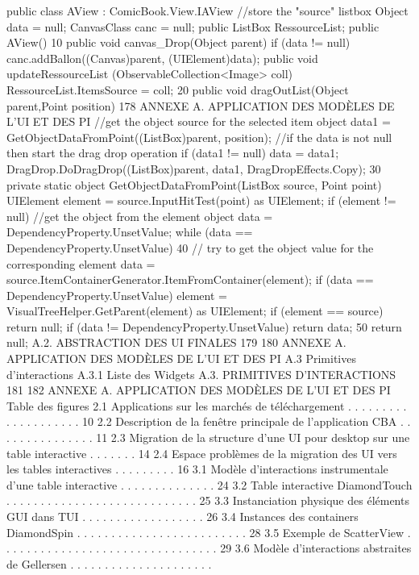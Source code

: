 \documentclass{article}
\begin{document}
{
public class AView : ComicBook.View.IAView
{
//store the "source" listbox
Object data = null;
CanvasClass canc = null;
public ListBox RessourceList;
public AView()
10
{ }
public void canvas_Drop(Object parent)
{
if (data != null)
canc.addBallon((Canvas)parent, (UIElement)data);
}
public void updateRessourceList (ObservableCollection<Image> coll)
{
RessourceList.ItemsSource = coll;
}
20
public void dragOutList(Object parent,Point position)
{
178
ANNEXE A. APPLICATION DES MODÈLES DE L’UI ET DES PI
//get the object source for the selected item
object data1 = GetObjectDataFromPoint((ListBox)parent, position);
//if the data is not null then start the drag drop operation
if (data1 != null)
{
data = data1;
DragDrop.DoDragDrop((ListBox)parent, data1, DragDropEffects.Copy);
30
}
}
private static object GetObjectDataFromPoint(ListBox source, Point point)
{
UIElement element = source.InputHitTest(point) as UIElement;
if (element != null)
{
//get the object from the element
object data = DependencyProperty.UnsetValue;
while (data == DependencyProperty.UnsetValue)
40
{
// try to get the object value for the corresponding element
data = source.ItemContainerGenerator.ItemFromContainer(element);
if (data == DependencyProperty.UnsetValue)
element = VisualTreeHelper.GetParent(element) as UIElement;
if (element == source)
return null;
}
if (data != DependencyProperty.UnsetValue)
return data;
50
}
return null;
}
}
}
A.2. ABSTRACTION DES UI FINALES
179
180
ANNEXE A. APPLICATION DES MODÈLES DE L’UI ET DES PI
A.3
Primitives d’interactions
A.3.1
Liste des Widgets
A.3. PRIMITIVES D’INTERACTIONS
181
182
ANNEXE A. APPLICATION DES MODÈLES DE L’UI ET DES PI
Table des ﬁgures
2.1
Applications sur les marchés de téléchargement . . . . . . . . . . . . . . . . . . . .
10
2.2
Description de la fenêtre principale de l’application CBA . . . . . . . . . . . . . . .
11
2.3
Migration de la structure d’une UI pour desktop sur une table interactive . . . . . . .
14
2.4
Espace problèmes de la migration des UI vers les tables interactives
. . . . . . . . .
16
3.1
Modèle d’interactions instrumentale d’une table interactive . . . . . . . . . . . . . .
24
3.2
Table interactive DiamondTouch . . . . . . . . . . . . . . . . . . . . . . . . . . . .
25
3.3
Instanciation physique des éléments GUI dans TUI . . . . . . . . . . . . . . . . . .
26
3.4
Instances des containers DiamondSpin . . . . . . . . . . . . . . . . . . . . . . . . .
28
3.5
Exemple de ScatterView
. . . . . . . . . . . . . . . . . . . . . . . . . . . . . . . .
29
3.6
Modèle d’interactions abstraites de Gellersen
. . . . . . . . . . . . . . . . . . . . .
\end{document}
